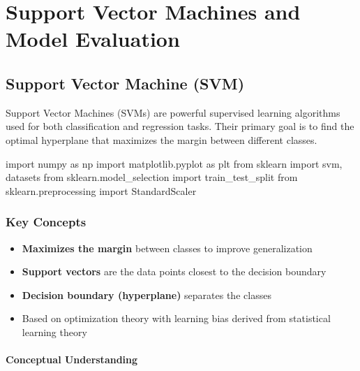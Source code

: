 \documentclass[
  letterpaper,
  DIV=11,
  numbers=noendperiod]{scrreprt}
\newenvironment{Shaded}{\begin{snugshade}}{\end{snugshade}}
\newcommand{\ImportTok}[1]{\textcolor[rgb]{0.00,0.46,0.62}{#1}}
\newcommand{\NormalTok}[1]{\textcolor[rgb]{0.00,0.23,0.31}{#1}}
\providecommand{\tightlist}{%
  \setlength{\itemsep}{0pt}\setlength{\parskip}{0pt}}\usepackage{longtable,booktabs,array}
\begin{document}

\chapter{Support Vector Machines and Model
Evaluation}\label{support-vector-machines-and-model-evaluation}

\section{Support Vector Machine (SVM)}\label{support-vector-machine-svm}

Support Vector Machines (SVMs) are powerful supervised learning
algorithms used for both classification and regression tasks. Their
primary goal is to find the optimal hyperplane that maximizes the margin
between different classes.

\begin{Shaded}
\begin{Highlighting}[]
\ImportTok{import}\NormalTok{ numpy }\ImportTok{as}\NormalTok{ np}
\ImportTok{import}\NormalTok{ matplotlib.pyplot }\ImportTok{as}\NormalTok{ plt}
\ImportTok{from}\NormalTok{ sklearn }\ImportTok{import}\NormalTok{ svm, datasets}
\ImportTok{from}\NormalTok{ sklearn.model\_selection }\ImportTok{import}\NormalTok{ train\_test\_split}
\ImportTok{from}\NormalTok{ sklearn.preprocessing }\ImportTok{import}\NormalTok{ StandardScaler}
\end{Highlighting}
\end{Shaded}

\subsection{Key Concepts}\label{key-concepts}

\begin{itemize}
\tightlist
\item
  \textbf{Maximizes the margin} between classes to improve
  generalization
\item
  \textbf{Support vectors} are the data points closest to the decision
  boundary
\item
  \textbf{Decision boundary (hyperplane)} separates the classes
\item
  Based on optimization theory with learning bias derived from
  statistical learning theory
\end{itemize}

\subsubsection{Conceptual Understanding}\label{conceptual-understanding}
\end{document}
